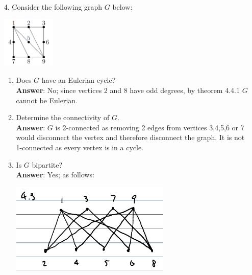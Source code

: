 \documentclass{article}
\begin{document}
\newpage
\begin{itemize}
    \item [4.] Consider the following graph $G$ below:
          \begin{center}
              \includegraphics[width=1in]{q4.png}
          \end{center}
          \begin{enumerate}
              \item Does $G$ have an Eulerian cycle?\\
                    \textbf{Answer}: No; since vertices 2 and 8 have odd degrees, by theorem 4.4.1 $G$ cannot be Eulerian.
              \item Determine the connectivity of $G$.\\
                    \textbf{Answer}: $G$ is 2-connected as removing 2 edges from vertices 3,4,5,6 or 7 would disconnect the vertex and therefore disconnect the graph. It is not 1-connected as every vertex is in a cycle.
              \item Is $G$ bipartite?\\
                    \textbf{Answer}: Yes; as follows:
                    \begin{center}
                        \includegraphics[width=3in]{4-3.png}
                    \end{center}
          \end{enumerate}
\end{itemize}
\end{document}
